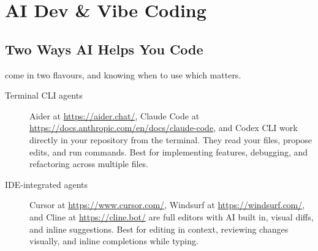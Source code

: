 




\chapter{AI Dev \& Vibe Coding}



\section{Two Ways AI Helps You Code}

 come in two flavours, and knowing when to use which matters.

\begin{description}
    \item[Terminal CLI agents] Aider at \url{https://aider.chat/},
    Claude Code at \url{https://docs.anthropic.com/en/docs/claude-code},
    and Codex CLI work directly in your repository from the terminal. They read your files, propose
    edits, and run commands. Best for implementing features, debugging, and refactoring across
    multiple files.
    \item[IDE-integrated agents] Cursor at \url{https://www.cursor.com/},
    Windsurf at \url{https://windsurf.com/}, and Cline at \url{https://cline.bot/} are full editors
    with AI built in, visual diffs, and inline suggestions. Best for editing in context, reviewing
    changes visually, and inline completions while typing.
\end{description}

